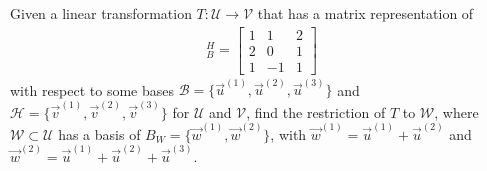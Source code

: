 \begin{exmp}
Given a linear transformation $T: \mathcal{U} \to \mathcal{V}$ that has a matrix representation of
\begin{align*}
[T]_B^H = 
\begin{bmatrix}
1 & 1 & 2 \\
2 & 0 & 1 \\
1 & -1 & 1
\end{bmatrix}
\end{align*}
with respect to some bases $\mathcal{B} = \{\vec{u}^{(1)}, \vec{u}^{(2)}, \vec{u}^{(3)}\}$ and $\mathcal{H} = \{\vec{v}^{(1)}, \vec{v}^{(2)}, \vec{v}^{(3)}\}$ for $\mathcal{U}$ and $\mathcal{V}$, find the restriction of $T$ to $\mathcal{W}$, where $\mathcal{W} \subset \mathcal{U}$ has a basis of $B_W = \{\vec{w}^{(1)}, \vec{w}^{(2)}\}$, with $\vec{w}^{(1)} = \vec{u}^{(1)} + \vec{u}^{(2)}$ and $\vec{w}^{(2)} = \vec{u}^{(1)} + \vec{u}^{(2)} + \vec{u}^{(3)}$.
\end{exmp}
